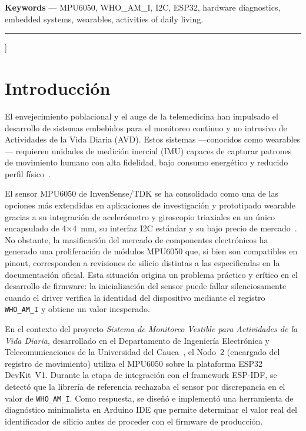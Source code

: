 \documentclass[10pt,twocolumn,a4paper]{article}
\begin{document}
{\begin{small}
\smallskip
\noindent\textbf{Keywords} — MPU6050, WHO\_AM\_I, I2C, ESP32, hardware
diagnostics, embedded systems, wearables, activities of daily living.
\end{small}
\vspace{4pt}\rule{\linewidth}{0.5pt}\vspace{4pt}
}]

\section{Introducción}

El envejecimiento poblacional y el auge de la telemedicina han impulsado
el desarrollo de sistemas embebidos para el monitoreo continuo y
no intrusivo de Actividades de la Vida Diaria (AVD). Estos sistemas
—conocidos como wearables— requieren unidades de medición inercial
(IMU) capaces de capturar patrones de movimiento humano con alta
fidelidad, bajo consumo energético y reducido perfil físico~\cite{chen2012}.

El sensor MPU6050 de InvenSense/TDK se ha consolidado como una de las
opciones más extendidas en aplicaciones de investigación y prototipado
wearable gracias a su integración de acelerómetro y giroscopio triaxiales
en un único encapsulado de 4$\times$4~mm, su interfaz I2C estándar y su
bajo precio de mercado~\cite{invensense2013}. No obstante, la masificación
del mercado de componentes electrónicos ha generado una proliferación de
módulos MPU6050 que, si bien son compatibles en pinout, corresponden a
revisiones de silicio distintas a las especificadas en la documentación
oficial. Esta situación origina un problema práctico y crítico en el
desarrollo de firmware: la inicialización del sensor puede fallar
silenciosamente cuando el driver verifica la identidad del dispositivo
mediante el registro \texttt{WHO\_AM\_I} y obtiene un valor inesperado.

En el contexto del proyecto \textit{Sistema de Monitoreo Vestible para
Actividades de la Vida Diaria}, desarrollado en el Departamento de
Ingeniería Electrónica y Telecomunicaciones de la Universidad del
Cauca~\cite{repo_github}, el Nodo~2 (encargado del registro de
movimiento) utiliza el MPU6050 sobre la plataforma ESP32 DevKit~V1.
Durante la etapa de integración con el framework ESP-IDF, se detectó
que la librería de referencia rechazaba el sensor por discrepancia en
el valor de \texttt{WHO\_AM\_I}. Como respuesta, se diseñó e implementó
una herramienta de diagnóstico minimalista en Arduino IDE que permite
determinar el valor real del identificador de silicio antes de proceder
con el firmware de producción.
\end{document}
